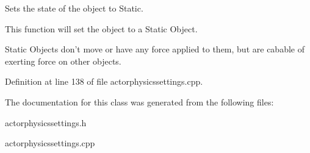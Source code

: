 Sets the state of the object to Static. 

This function will set the object to a Static Object. \par
 Static Objects don't move or have any force applied to them, but are cabable of exerting force on other objects. 

Definition at line 138 of file actorphysicssettings.cpp.



The documentation for this class was generated from the following files:\begin{DoxyCompactItemize}
\item 
actorphysicssettings.h\item 
actorphysicssettings.cpp\end{DoxyCompactItemize}
